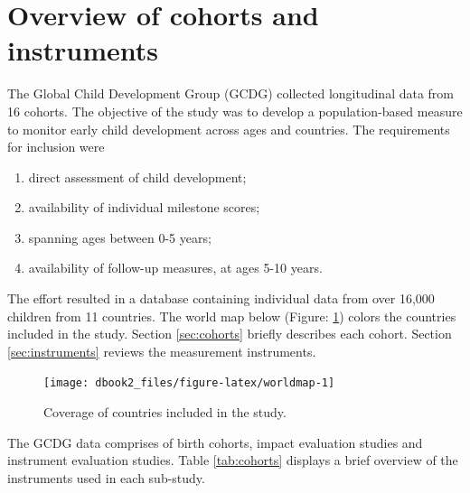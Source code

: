 \documentclass[
]{book}
\providecommand{\tightlist}{%
  \setlength{\itemsep}{0pt}\setlength{\parskip}{0pt}}
\begin{document}
\hypertarget{sec:gcdgoverview}{%
\section{Overview of cohorts and instruments}\label{sec:gcdgoverview}}

The Global Child Development Group (GCDG) collected longitudinal data from 16 cohorts. The objective of the study was to develop a population-based measure to monitor early child development across ages and countries. The requirements for inclusion were

\begin{enumerate}
\def\labelenumi{\arabic{enumi}.}
\tightlist
\item
  direct assessment of child development;
\item
  availability of individual milestone scores;
\item
  spanning ages between 0-5 years;
\item
  availability of follow-up measures, at ages 5-10 years.
\end{enumerate}

The effort resulted in a database containing individual data from over 16,000 children from 11 countries. The world map below (Figure: \ref{fig:worldmap}) colors the countries included in the study. Section \ref{sec:cohorts} briefly describes each cohort. Section \ref{sec:instruments} reviews the measurement instruments.

\begin{figure}

{\centering \texttt{[image: dbook2\_files/figure-latex/worldmap-1]} 

}

\caption{Coverage of countries included in the study.}\label{fig:worldmap}
\end{figure}



The GCDG data comprises of birth cohorts, impact evaluation studies and instrument evaluation studies. Table \ref{tab:cohorts} displays a brief overview of the instruments used in each sub-study.
\end{document}
